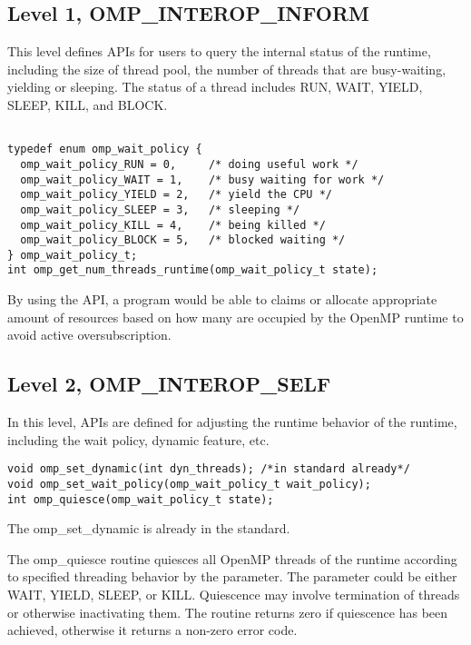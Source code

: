 {\subsection{Level 1, OMP\_INTEROP\_INFORM}
This level defines APIs for users to query the internal status of the runtime, including the size of thread pool, the number of threads
that are busy-waiting, yielding or sleeping. The status of a thread includes RUN, WAIT, YIELD, SLEEP, KILL, and BLOCK. 

\lstset{basicstyle=\sffamily\small,language=c, numbersep=1pt}
\begin{lstlisting}[frame=single]  % Start your code-block

typedef enum omp_wait_policy {
  omp_wait_policy_RUN = 0,     /* doing useful work */
  omp_wait_policy_WAIT = 1,    /* busy waiting for work */
  omp_wait_policy_YIELD = 2,   /* yield the CPU */
  omp_wait_policy_SLEEP = 3,   /* sleeping */
  omp_wait_policy_KILL = 4,    /* being killed */
  omp_wait_policy_BLOCK = 5,   /* blocked waiting */
} omp_wait_policy_t; 
int omp_get_num_threads_runtime(omp_wait_policy_t state);
\end{lstlisting}

By using the API, a program would be able to claims or allocate appropriate amount of resources based on how many are occupied by the OpenMP
runtime to avoid active oversubscription. 

\subsection{Level 2, OMP\_INTEROP\_SELF} 
In this level, APIs are defined for adjusting the runtime behavior of the runtime, including the wait policy, dynamic feature, etc.

\begin{lstlisting}[frame=single]
void omp_set_dynamic(int dyn_threads); /*in standard already*/
void omp_set_wait_policy(omp_wait_policy_t wait_policy);
int omp_quiesce(omp_wait_policy_t state);
\end{lstlisting}
The {\sf omp\_set\_dynamic} is already in the standard. 

The {\sf omp\_quiesce} routine quiesces all OpenMP threads of the runtime according to specified threading behavior by the parameter. The
parameter could be either WAIT, YIELD, SLEEP, or KILL. Quiescence may involve termination
 of threads or otherwise inactivating them. The routine returns zero if quiescence has been achieved, otherwise it returns a non-zero error code.

}
